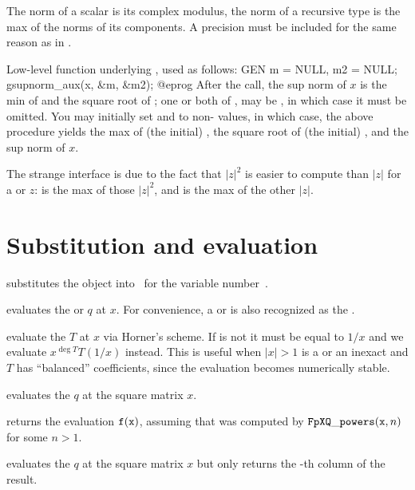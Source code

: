  The norm of a scalar is its complex
modulus, the norm of a recursive type is the max of the norms of its
components. A precision  must be included for the same reason as in
.

Low-level function underlying
, used as follows:
\bprog
  GEN m = NULL, m2 = NULL;
  gsupnorm_aux(x, &m, &m2);
@eprog
After the call, the sup norm of $x$ is the min of  and the square root
of ;  one or both of ,  may be , in
which case it must be omitted. You may initially set  and  to
non- values, in which case, the above procedure yields the max of
(the initial) , the square root of (the initial) , and the sup
norm of $x$.

The strange interface is due to the fact that $|z|^2$ is easier to compute
than $|z|$ for a  or  $z$:  is the max of
those $|z|^2$, and  is the max of the other $|z|$.

\section{Substitution and evaluation}

 substitutes the object 
into~ for the variable number~.

 evaluates the  or 
$q$ at $x$. For convenience, a  or  is also recognized as
the  .

 evaluate the  $T$
at $x$ via Horner's scheme. If  is not  it must be equal to
$1/x$ and we evaluate $x^{\deg T}T(1/x)$ instead. This is useful when
$|x| > 1$ is a  or an inexact  and $T$ has
``balanced'' coefficients, since the evaluation becomes numerically stable.

 evaluates the  $q$ at the
square matrix $x$.

 returns
the evaluation ${\tt f}({\tt x})$, assuming that  was computed by
${\tt FpXQ\_powers}({\tt x}, n)$ for some $n>1$.

 evaluates the  $q$
at the square matrix $x$ but only returns the -th column of the result.

